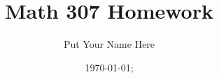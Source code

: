 \documentclass[12pt]{article}
\begin{document}
 
\title{Math 307 Homework}
\author{Put Your Name Here}
\date{\today; \currenttime}
\maketitle


 
 
    
    \newpage
    
    \newpage
    
\end{document}
